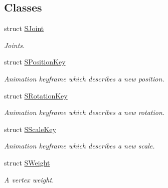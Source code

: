 \subsection*{Classes}
\begin{DoxyCompactItemize}
\item 
struct \hyperlink{structirr_1_1scene_1_1ISkinnedMesh_1_1SJoint}{S\+Joint}
\begin{DoxyCompactList}\small\item\em Joints. \end{DoxyCompactList}\item 
struct \hyperlink{structirr_1_1scene_1_1ISkinnedMesh_1_1SPositionKey}{S\+Position\+Key}
\begin{DoxyCompactList}\small\item\em Animation keyframe which describes a new position. \end{DoxyCompactList}\item 
struct \hyperlink{structirr_1_1scene_1_1ISkinnedMesh_1_1SRotationKey}{S\+Rotation\+Key}
\begin{DoxyCompactList}\small\item\em Animation keyframe which describes a new rotation. \end{DoxyCompactList}\item 
struct \hyperlink{structirr_1_1scene_1_1ISkinnedMesh_1_1SScaleKey}{S\+Scale\+Key}
\begin{DoxyCompactList}\small\item\em Animation keyframe which describes a new scale. \end{DoxyCompactList}\item 
struct \hyperlink{structirr_1_1scene_1_1ISkinnedMesh_1_1SWeight}{S\+Weight}
\begin{DoxyCompactList}\small\item\em A vertex weight. \end{DoxyCompactList}\end{DoxyCompactItemize}

